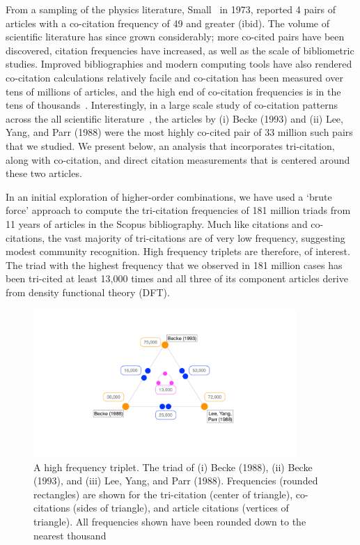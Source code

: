 \documentclass[11pt, oneside]{article}   	%
\begin{document}
From a sampling of the physics literature, Small~\citep{Small1973} in 1973, reported 4 pairs of articles with a co-citation frequency of 49 and greater (ibid). The volume of scientific literature has since grown considerably; more co-cited pairs have been discovered, citation frequencies have increased, as well as the scale of bibliometric studies. Improved bibliographies and modern computing tools have also rendered co-citation calculations relatively facile and co-citation has been measured over tens of millions of articles, and the high end of co-citation frequencies is in the tens of thousands~\citep{Stringer2010,Uzzi2013,devarakonda_2020}. Interestingly, in a large scale study of co-citation patterns across the all scientific literature~\citep{devarakonda_2020}, the articles by (i) Becke (1993)\citep{becke1993dft} and (ii) Lee, Yang, and Parr (1988)\citep{lyp1988} were the most highly co-cited pair of 33 million such pairs that we studied. We present below, an analysis that incorporates tri-citation, along with co-citation, and direct citation measurements that is centered around these two articles. 


In an initial exploration of higher-order combinations, we have used a `brute force' approach to compute the tri-citation frequencies of 181 million triads from 11 years of articles in the Scopus bibliography.  Much like citations and co-citations, the vast majority of tri-citations are of very low frequency, suggesting modest community recognition. High frequency triplets are therefore, of interest. The triad with the highest frequency that we observed in 181 million cases has been tri-cited at least 13,000 times and all three of its component articles derive from density functional theory (DFT). 
\begin{figure}[h!]
\begin{center}
\includegraphics[width=10cm]{fig1_tricite.pdf}%
\end{center}
\caption{A high frequency triplet. The triad of (i) Becke (1988), (ii) Becke (1993), and (iii) Lee, Yang, and Parr (1988).  Frequencies (rounded rectangles) are shown for the tri-citation (center of triangle), co-citations (sides of triangle), and article citations (vertices of triangle). All frequencies shown have been rounded down to the nearest thousand
}
\label{fig:fig1}
\end{figure}
\end{document}
